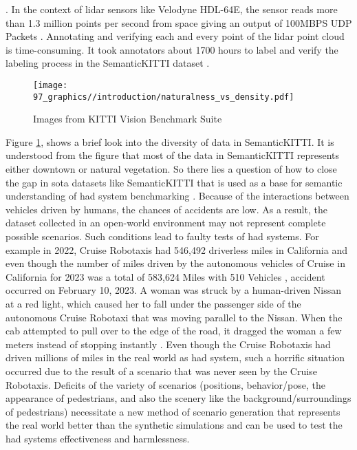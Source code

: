 \parencite{qi2017pointnet}. In the context of lidar sensors like Velodyne HDL-64E, the sensor reads more than 1.3 million points per second from space giving an output of 100MBPS UDP Packets \parencite{velodyne_64}. Annotating and verifying each and every point of the lidar point cloud is time-consuming. It took annotators about 1700 hours to label and verify the labeling process in the SemanticKITTI dataset \parencite{behley2019semantickitti}.

\begin{figure}[htbp]
    \centering
    \texttt{[image: 97\_graphics//introduction/naturalness\_vs\_density.pdf]}
    \caption{Images from KITTI Vision Benchmark Suite \parencite{Geiger2012CVPR}}
    \label{fig:introduction_surf_variation_in_kitti}
\end{figure}

Figure \ref{fig:introduction_surf_variation_in_kitti}, shows a brief look into the diversity of data in SemanticKITTI. It is understood from the figure that most of the data in SemanticKITTI represents either downtown or natural vegetation. So there lies a question of how to close the gap in \acrfull{sota} datasets like SemanticKITTI that is used as a base for semantic understanding of \acrshort{had} system benchmarking \parencite{papers-with-code}. Because of the interactions between vehicles driven by humans, the chances of accidents are low. As a result, the dataset collected in an open-world environment may not represent complete possible scenarios. Such conditions lead to faulty tests of \acrshort{had} systems. For example in 2022, Cruise Robotaxis had 546,492 driverless miles in California and even though the number of miles driven by the autonomous vehicles of Cruise in California for 2023 was a total of 583,624 Miles with 510 Vehicles \parencite{disengagement_report}, accident occurred on February 10, 2023. A woman was struck by a human-driven Nissan at a red light, which caused her to fall under the passenger side of the autonomous Cruise Robotaxi that was moving parallel to the Nissan. When the cab attempted to pull over to the edge of the road, it dragged the woman a few meters instead of stopping instantly \parencite{cruise_crash}. Even though the Cruise Robotaxis had driven millions of miles in the real world as \acrshort{had} system, such a horrific situation occurred due to the result of a scenario that was never seen by the Cruise Robotaxis. Deficits of the variety of scenarios (positions, behavior/pose, the appearance of pedestrians, and also the scenery like the background/surroundings of pedestrians) necessitate a new method of scenario generation that represents the real world better than the synthetic simulations and can be used to test the \acrshort{had} systems effectiveness and harmlessness.

